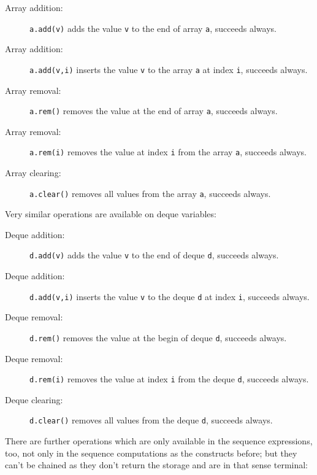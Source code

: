 \begin{description}
\item[Array addition:] \texttt{a.add(v)} adds the value \texttt{v} to the end of array \texttt{a}, succeeds always.
\item[Array addition:] \texttt{a.add(v,i)} inserts the value \texttt{v} to the array \texttt{a} at index \texttt{i}, succeeds always.
\item[Array removal:] \texttt{a.rem()} removes the value at the end of array \texttt{a}, succeeds always.
\item[Array removal:] \texttt{a.rem(i)} removes the value at index \texttt{i} from the array \texttt{a}, succeeds always.
\item[Array clearing:] \texttt{a.clear()} removes all values from the array \texttt{a}, succeeds always.
\end{description}

\noindent Very similar operations are available on deque variables:

\begin{description}
\item[Deque addition:] \texttt{d.add(v)} adds the value \texttt{v} to the end of deque \texttt{d}, succeeds always.
\item[Deque addition:] \texttt{d.add(v,i)} inserts the value \texttt{v} to the deque \texttt{d} at index \texttt{i}, succeeds always.
\item[Deque removal:] \texttt{d.rem()} removes the value at the begin of deque \texttt{d}, succeeds always.
\item[Deque removal:] \texttt{d.rem(i)} removes the value at index \texttt{i} from the deque \texttt{d}, succeeds always.
\item[Deque clearing:] \texttt{d.clear()} removes all values from the deque \texttt{d}, succeeds always.
\end{description}

\noindent There are further operations which are only available in the sequence expressions, too, not only in the sequence computations as the constructs before; but they can't be chained as they don't return the storage and are in that sense terminal:

